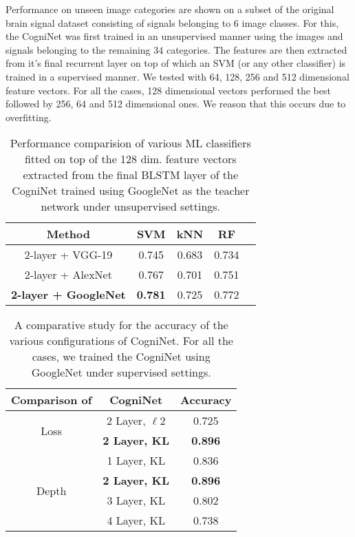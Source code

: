 \documentclass{article}
\begin{document}
Performance on unseen image categories are shown on a subset of the original brain signal dataset consisting of signals belonging to $6$ image classes. For this, the CogniNet was first trained in an unsupervised manner using the images and signals belonging to the remaining $34$ categories. The features are then extracted from it's final recurrent layer on top of which an SVM (or any other classifier) is trained in a supervised manner. We tested with 64, 128, 256 and 512 dimensional feature vectors. For all the cases, 128 dimensional vectors performed the best followed by 256, 64 and 512 dimensional ones. We reason that this occurs due to overfitting.
\begin{table}
\centering
\begin{tabular}{ccccc}
\hline
\textbf{Method} & \textbf{SVM} & \textbf{kNN} & \textbf{RF}\\
\hline
2-layer + VGG-19 & 0.745 & 0.683 & 0.734\\
2-layer + AlexNet & 0.767 & 0.701 & 0.751\\
\textbf{2-layer + GoogleNet} & \textbf{0.781} & 0.725 & 0.772\\
\hline
\end{tabular}
\caption{Performance comparision of various ML classifiers fitted on top of the 128 dim. feature vectors extracted from the final BLSTM layer of the CogniNet trained using GoogleNet as the teacher network under unsupervised settings.}
\label{tab: exp1}
\end{table}
\begin{table}
\centering
\begin{tabular}{ccc}
\hline
\textbf{Comparison of} & \textbf{CogniNet} & \textbf{Accuracy}\\
\hline
\multirow{2}{*}{Loss} & 2 Layer, $\ell2$ & 0.725\\
& \textbf{2 Layer, KL} & \textbf{0.896}\\ 
\hline
\multirow{4}{*}{Depth} & 1 Layer, KL & 0.836\\
& \textbf{2 Layer, KL} & \textbf{0.896}\\
& 3 Layer, KL & 0.802\\
& 4 Layer, KL & 0.738\\
\hline
\end{tabular}
\caption{A comparative study for the accuracy of the various configurations of CogniNet. For all the cases, we trained the  CogniNet using GoogleNet under supervised settings.}
\label{tab: exp1}
\end{table}
\end{document}

